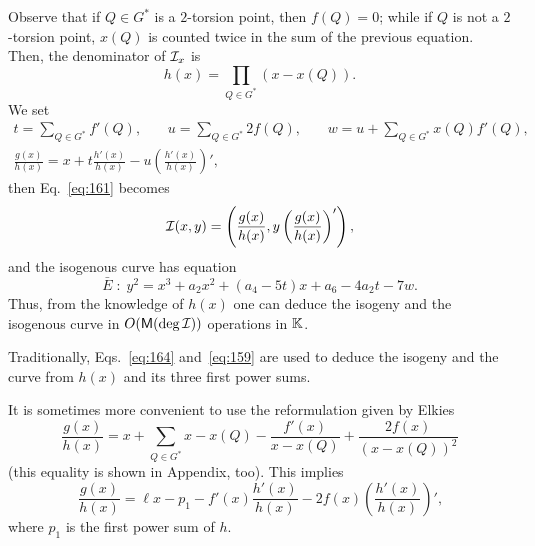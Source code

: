Observe that if $Q\in G^\ast$ is a $2$-torsion point, then $f(Q)=0$;
while if $Q$ is not a $2$-torsion point, $x(Q)$ is counted twice in
the sum of the previous equation. Then, the denominator of $\mathcal{I}_x$ is
  \begin{equation}
    \label{eq:158}
    h(x) = \prod_{Q\in G^\ast}(x - x(Q))
    \text{.}
  \end{equation}
We set
\begin{equation}
  \label{eq:164}
  \begin{gathered}
    t = \sum_{Q\in G^\ast} f'(Q)\text{,}
    \qquad
    u = \sum_{Q\in G^\ast} 2f(Q)\text{,}
    \qquad
    w = u + \sum_{Q\in G^\ast} x(Q)f'(Q)\text{,}\\
    \frac{g(x)}{h(x)} = x + t\frac{h'(x)}{h(x)} - u\left(\frac{h'(x)}{h(x)}\right)'
    \text{,}
  \end{gathered}
\end{equation}
then Eq.~\eqref{eq:161} becomes
\begin{equation}
  \label{eq:159}
  \mathcal{I}(x,y) = \left(\frac{g(x)}{h(x)}, y\left(\frac{g(x)}{h(x)}\right)'\right)
  \text{,}
\end{equation}
and the isogenous curve has equation
\begin{equation}
  \label{eq:163}
  \bar{E}\;:\;y^2 = x^3 + a_2x^2 + (a_4-5t)x + a_6 - 4a_2t - 7w
  \text{.}
\end{equation}
Thus, from the knowledge of $h(x)$ one can deduce the isogeny and the
isogenous curve in $O(\mathsf{M}(\deg\mathcal{I}))$ operations in $\mathbb{K}$.

\begin{remark}
  Traditionally, Eqs.~\eqref{eq:164} and~\eqref{eq:159} are used to
  deduce the isogeny and the curve from $h(x)$ and its three first
  power sums.

    It is sometimes more
  convenient to use the reformulation given by Elkies~\cite{elkies98}
  \begin{equation}
    \label{eq:157}
    \frac{g(x)}{h(x)} = x + \sum_{Q\in G^\ast}x - x(Q) - \frac{f'(x)}{x-x(Q)} + \frac{2f(x)}{(x-x(Q))^2}
  \end{equation}
  (this equality is shown in Appendix, too). This implies
  \begin{equation}
    \label{eq:165}
    \frac{g(x)}{h(x)} = \ell x - p_1 - f'(x)\frac{h'(x)}{h(x)} -
    2f(x)\left(\frac{h'(x)}{h(x)}\right)'
    \text{,}
  \end{equation}
  where $p_1$ is the first power sum of $h$.
\end{remark}

